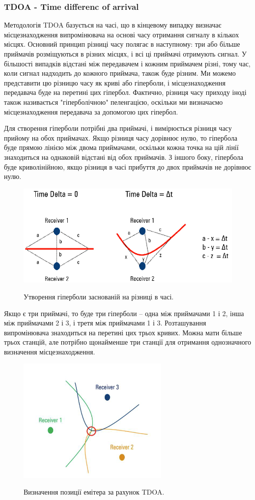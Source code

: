 \documentclass{article}
\begin{document}
\subsubsection{TDOA - Time differenc of arrival}
Методологія TDOA базується на часі, що в кінцевому випадку визначає місцезнаходження випромінювача на основі часу отримання сигналу в кількох місцях. Основний принцип різниці часу полягає в наступному: три або більше приймачів розміщуються в різних місцях, і всі ці приймачі отримують сигнал. У більшості випадків відстані між передавачем і кожним приймачем різні, тому час, коли сигнал надходить до кожного приймача, також буде різним. Ми можемо представити цю різницю часу як криві або гіперболи, і місцезнаходження передавача буде на перетині цих гіпербол. Фактично, різниця часу приходу іноді також називається "гіперболічною" пеленгацією, оскільки ми визначаємо місцезнаходження передавача за допомогою цих гіпербол.

Для створення гіперболи потрібні два приймачі, і вимірюється різниця часу прийому на обох приймачах. Якщо різниця часу дорівнює нулю, то гіпербола буде прямою лінією між двома приймачами, оскільки кожна точка на цій лінії знаходиться на однаковій відстані від обох приймачів. З іншого боку, гіпербола буде криволінійною, якщо різниця в часі прибуття до двох приймачів не дорівнює нулю.

\begin{figure}[H]
	\centering
	{\includegraphics[width=0.7\linewidth]{images/tdoa.png}}
	\caption{Утворення гіперболи заснованій на різниці в часі.}
\end{figure}

Якщо є три приймачі, то буде три гіперболи – одна між приймачами 1 і 2, інша між приймачами 2 і 3, і третя між приймачами 1 і 3. Розташування випромінювача знаходиться
на перетині цих трьох кривих. Можна мати більше трьох станцій, але
потрібно щонайменше три станції для отримання однозначного визначення місцезнаходження.


\begin{figure}[H]
	\centering
	{\includegraphics[width=0.4\linewidth]{images/tdoa-3p.png}}
	\caption{Визначення позиції емітера за рахунок TDOA.}
\end{figure}
\end{document}
